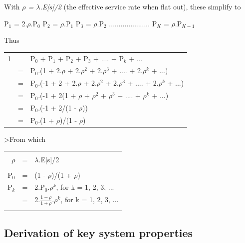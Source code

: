 \documentclass[12pt,fleqn]{report}
\begin{document}
\noindent
With {\em $\rho$ = $\lambda$.E[s]/2} (the effective service rate when flat
out), these simplify to


\begin{center}
P$_1$ = 2.$\rho$.P$_0$ \hspace*{0.25in}
P$_2$ = $\rho$.P$_1$ \hspace*{0.25in}
P$_3$ = $\rho$.P$_2$ \hspace*{0.25in}
.....................\hspace*{0.25in}
P$_{K}$ = $\rho$.P$_{K-1}$
\end{center}


\noindent
Thus 

\begin{tabular}{ r c l}
1 & = & P$_0$ + P$_1$ + P$_2$ + P$_3$ + .... + P$_k$ + ...\\
  & = & P$_0$.(1 + 2.$\rho$ + 2.$\rho^2$ + 2.$\rho^3$ + .... +
  2.$\rho^k$ + ...)\\
  & = & P$_0$.(-1 + 2 + 2.$\rho$ + 2.$\rho^2$ + 2.$\rho^3$ + .... +
  2.$\rho^k$ + ...)\\
  & = & P$_0$.(-1 + 2(1 + $\rho$ + $\rho^2$ + $\rho^3$ + .... +
  $\rho^k$ + ...)\\
  & = & P$_0$.(-1 + 2/(1 - $\rho$))\\
  & = & P$_0$.(1 + $\rho$)/(1 - $\rho$)\\
\end{tabular}

\noindent
>From which 

\begin{tabular}{||r c l ||}
\hline
&&\\
\hspace*{1in}
$\rho$ & = & $\lambda$.E[s]/2 \\
&&\\
P$_0$  & = & (1 - $\rho$)/(1 + $\rho$) \\
P$_k$  & = & 2.P$_0$.$\rho^k$, for k = 1, 2, 3, ...\\
       & = & 2.$\frac{1 - \rho}{1 + \rho}$.$\rho^k$, for k = 1, 2, 3, ...
            \hspace*{1in} \\
&&\\
\hline
\end{tabular}

\subsection{Derivation of key system properties}
\end{document}
